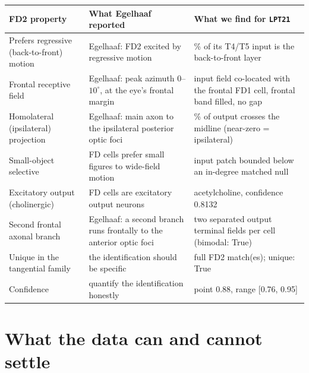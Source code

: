 \documentclass[11pt]{article}
\newcommand{\ttt}[1]{\texttt{#1}}
\begin{document}
\begin{table}[H]\centering\footnotesize\caption{Each defining property of Egelhaaf's FD2 cell and the matching measurement for the FlyWire cell type \ttt{LPT21}.}\label{tab:evidence}

\renewcommand{\arraystretch}{1.25}
\setlength{\tabcolsep}{3pt}
\begin{longtable}{@{}>{\raggedright\arraybackslash}p{} >{\raggedright\arraybackslash}p{} >{\raggedright\arraybackslash}p{}@{}}
\toprule \textbf{FD2 property} & \textbf{What Egelhaaf reported} & \textbf{What we find for \ttt{LPT21}} \\\midrule\endhead
Prefers regressive (back-to-front) motion & Egelhaaf: FD2 excited by regressive motion & 98.47\% of its T4/T5 input is the back-to-front layer \\
Frontal receptive field & Egelhaaf: peak azimuth $0$--$10^\circ$, at the eye's frontal margin & input field co-located with the frontal FD1 cell, frontal band filled, no gap \\
Homolateral (ipsilateral) projection & Egelhaaf: main axon to the ipsilateral posterior optic foci & 1.58\% of output crosses the midline (near-zero = ipsilateral) \\
Small-object selective & FD cells prefer small figures to wide-field motion & input patch bounded below an in-degree matched null \\
Excitatory output (cholinergic) & FD cells are excitatory output neurons & acetylcholine, confidence 0.8132 \\
Second frontal axonal branch & Egelhaaf: a second branch runs frontally to the anterior optic foci & two separated output terminal fields per cell (bimodal: True) \\
Unique in the tangential family & the identification should be specific & 1 full FD2 match(es); unique: True \\
Confidence & quantify the identification honestly & point 0.88, range [0.76, 0.95] \\
\bottomrule\end{longtable}
\renewcommand{\arraystretch}{1.0}
\setlength{\tabcolsep}{6pt}

\end{table}

\section{What the data can and cannot settle}
\end{document}
